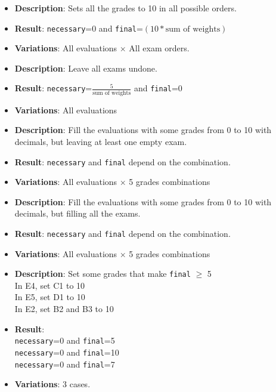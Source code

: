 \begin{itemize}[noitemsep]
    \item \textbf{Description}: Sets all the grades to 10 in all possible orders. 
    \item \textbf{Result}: \texttt{necessary}=0 and \texttt{final}=$(10*\text{sum of weights})$
    \item \textbf{Variations}: All evaluations $\times$ All exam orders.
\end{itemize}
\vfill
{}
\begin{itemize}[noitemsep]
    \item \textbf{Description}: Leave all exams undone.
    \item \textbf{Result}: \texttt{necessary}=$\frac{5}{\text{sum of weights}}$ and \texttt{final}=0
    \item \textbf{Variations}: All evaluations
\end{itemize}
\vfill
{}
\begin{itemize}[noitemsep]
    \item \textbf{Description}: Fill the evaluations with some grades from 0 to 10 with decimals, but leaving at least one empty exam. 
    \item \textbf{Result}: \texttt{necessary} and \texttt{final} depend on the combination.
    \item \textbf{Variations}: All evaluations $\times$ 5 grades combinations
\end{itemize}
\vfill
{}
\begin{itemize}[noitemsep]
    \item \textbf{Description}: Fill the evaluations with some grades from 0 to 10 with decimals, but filling all the exams. 
    \item \textbf{Result}: \texttt{necessary} and \texttt{final} depend on the combination.
    \item \textbf{Variations}: All evaluations $\times$ 5 grades combinations
\end{itemize}
\vfill
{}
\begin{itemize}[noitemsep]
    \item \textbf{Description}: Set some grades that make \texttt{final} $\geq$ 5\\
        In E4, set C1 to 10 \\
        In E5, set D1 to 10 \\
        In E2, set B2 and B3 to 10
    \item \textbf{Result}: \\
        \texttt{necessary}=0 and \texttt{final}=5 \\
        \texttt{necessary}=0 and \texttt{final}=10 \\
        \texttt{necessary}=0 and \texttt{final}=7
    \item \textbf{Variations}: 3 cases.
\end{itemize}
